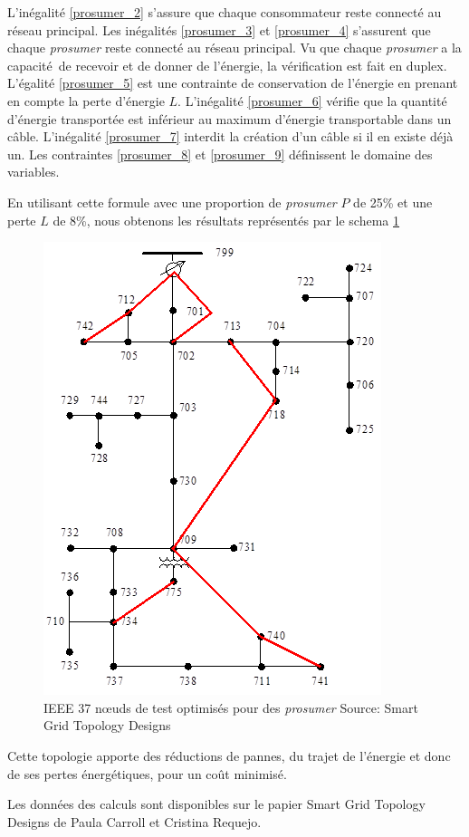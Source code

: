 L'inégalité \ref{prosumer_2} s'assure que chaque consommateur reste connecté au réseau principal.
Les inégalités \ref{prosumer_3} et \ref{prosumer_4} s'assurent que chaque \textit{prosumer} reste connecté au réseau principal.
Vu que chaque \textit{prosumer} a la capacité de recevoir et de donner de l'énergie, la vérification
est fait en duplex.
L'égalité \ref{prosumer_5} est une contrainte de conservation de l'énergie en prenant en compte la perte d'énergie $L$.
L'inégalité \ref{prosumer_6} vérifie que la quantité d'énergie transportée est inférieur au maximum d'énergie transportable dans un câble.
L'inégalité \ref{prosumer_7} interdit la création d'un câble si il en existe déjà un.
Les contraintes \ref{prosumer_8} et \ref{prosumer_9} définissent le domaine des variables.

En utilisant cette formule avec une proportion de \textit{prosumer} $P$ de 25\% et une perte $L$ de 8\%,
nous obtenons les résultats représentés par le schema \ref{fig:ieee_radial_tree_optimized}

\begin{figure}
  \includegraphics[scale=0.5]{media/ieee_radial_tree_optimized.png}
  \caption{
      IEEE 37 nœuds de test optimisés pour des \textit{prosumer}\newline
      \tiny{Source:\newline
        Smart Grid Topology Designs
      }
  }
  \label{fig:ieee_radial_tree_optimized}
\end{figure}

Cette topologie apporte des réductions de pannes, du trajet de l'énergie et donc de ses pertes énergétiques, pour un coût
minimisé.

Les données des calculs sont disponibles sur le papier Smart Grid Topology Designs de Paula Carroll et Cristina Requejo.